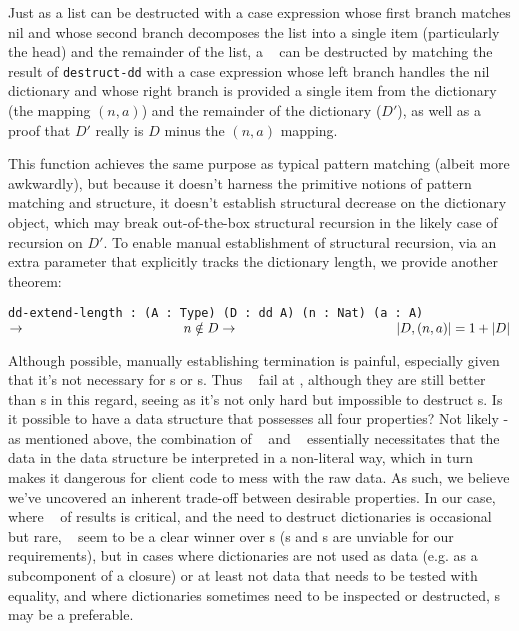 Just as a list can be destructed with a case expression whose first branch matches nil and whose second branch
decomposes the list into a single item (particularly the head) and the remainder of the list, a \dd~ can be
destructed by matching the result of \texttt{destruct-dd} with a case expression whose left branch handles the
nil dictionary and whose right branch is provided a single item from the dictionary (the mapping $(n, a)$)
and the remainder of the dictionary ($D'$), as well as a proof that $D'$ really is $D$ minus the $(n, a)$
mapping.

This function achieves the same purpose as typical pattern matching (albeit more awkwardly), but because it
doesn't harness the primitive notions of pattern matching and structure, it doesn't establish structural
decrease on the dictionary object, which may break out-of-the-box structural recursion in the likely case
of recursion on $D'$. To enable manual establishment of structural recursion, via an extra parameter that
explicitly tracks the dictionary length, we provide another theorem:

\texttt{dd-extend-length : (A : Type) (D : dd A) (n : Nat) (a : A) $\rightarrow \\
\phantom{xxxxxxxxxxxxxxxxxxxxx} n \notin D \rightarrow \\
\phantom{xxxxxxxxxxxxxxxxxxxxx} |D, (n, a)| = 1 + |D|$}

Although possible, manually establishing termination is painful, especially given that it's not necessary
for {\SAL}s or {\CAL}s. Thus \dds~ fail at \EzDstr, although they are still better than {\FPF}s in this
regard, seeing as it's not only hard but impossible to destruct {\FPF}s. Is it possible to have a data
structure that possesses all four properties? Not likely - as mentioned above, the combination of
\SemInj~ and \SemTot~ essentially
necessitates that the data in the data structure be interpreted in a non-literal way, which in turn
makes it dangerous for client code to mess with the raw data. As such, we believe we've uncovered an
inherent trade-off between desirable properties. In our case, where \EqDec~ of results is critical,
and the need to destruct dictionaries is occasional but rare, \dds~ seem to be a clear winner over
{\CAL}s ({\SAL}s and {\FPF}s are unviable for our requirements), but in cases where dictionaries are
not used as data
(e.g. as a subcomponent of a closure) or at least not data that needs to be tested with equality, and
where dictionaries sometimes need to be inspected or destructed, {\CAL}s may be a preferable.
